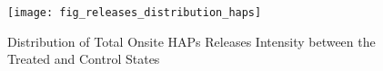 \begin{figure}[H]
    \centering
    \texttt{[image: fig\_releases\_distribution\_haps]}
    \caption{Distribution of Total Onsite HAPs Releases Intensity between the Treated and Control States}
    \label{fig:releases-distribution-haps}
\end{figure}